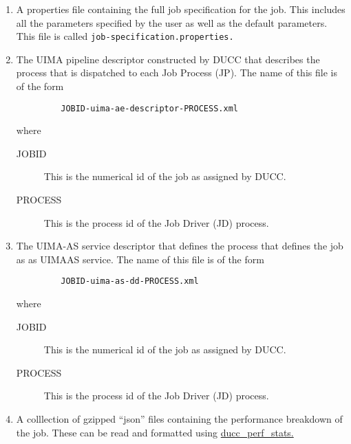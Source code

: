 \begin{enumerate}
    \item A properties file containing the full job specification for the job. This includes all the 
      parameters specified by the user as well as the default parameters. This file is called
      {\tt job-specification.properties.}
    \item The UIMA pipeline descriptor constructed by DUCC that describes the process that is 
      dispatched to each Job Process (JP). The name of this file is of the form 
\begin{verbatim}
         JOBID-uima-ae-descriptor-PROCESS.xml 
\end{verbatim}
      where 
      \begin{description}
          \item[JOBID] This is the numerical id of the job as assigned by DUCC.
          \item[PROCESS] This is the process id of the Job Driver (JD) process.
      \end{description}      

    \item The UIMA-AS service descriptor that defines the process that defines the job as as UIMAAS 
      service. The name of this file is of the form 
\begin{verbatim}
         JOBID-uima-as-dd-PROCESS.xml 
\end{verbatim}
      
      where 
      \begin{description}
         \item[JOBID] This is the numerical id of the job as assigned by DUCC.
         \item[PROCESS] This is the process id of the Job Driver (JD) process.
      \end{description}
      
    \item A colllection of gzipped ``json'' files containing the performance breakdown of the job.
      These can be read and formatted using \hyperref[sec:cli.ducc-perf-stats]{ducc\_perf\_stats.}
\end{enumerate}


